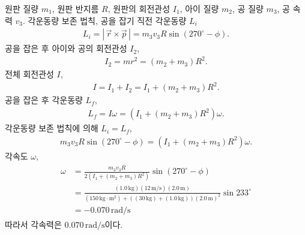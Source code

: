 \documentclass[floatfix,nofootinbib,superscriptaddress,fleqn]{revtex4-2}
\begin{document}
원판 질량 $m_1$, 원판 반지름 $R$, 원판의 회전관성 $I_1$, 
아이 질량 $m_2$, 공 질량 $m_3$, 공 속력 $v_3$.
각운동량 보존 법칙, 공을 잡기 직전 각운동량 $L_i$
\begin{align}
  L_i =|\,\vec{r}\times\vec{p}\,|
  = m_3v_3R\sin\left(270^\circ-\phi\right).
\end{align}
공을 잡은 후 아이와 공의 회전관성 $I_2$,
\begin{align}
  I_2 = mr^2 = (m_2+m_3)R^2.
\end{align} 
전체 회전관성 $I$,
\begin{align}
  I = I_1 + I_2 = I_1+(m_2+m_3)R^2.
\end{align}
공을 잡은 후 각운동량 $L_f$,
\begin{align}
  L_f = I\omega = (I_1+(m_2+m_3)R^2)\omega.
\end{align}
각운동량 보존 법칙에 의해 $L_i = L_f$,
\begin{align}
  m_3v_3R\sin\left(270^\circ-\phi\right)
  =(I_1+(m_2+m_3)R^2)\omega.
\end{align}
각속도 $\omega$,
\begin{align}
  \begin{split}
    \omega &= \frac{m_3v_3R}{2(I_1+(m_2+m_3)R^2)}\sin\left(270^\circ-\phi\right)  \\
    &= \frac{(1.0\,\mathrm{kg})(12\,\mathrm{m/s})(2.0\,\mathrm{m})}{(150\,\mathrm{kg\cdot m^2})
    +((30\,\mathrm{kg})+(1.0\,\mathrm{kg}))(2.0\,\mathrm{m})^2}\sin 233^\circ \\
   &=-0.070\,\mathrm{rad/s}
  \end{split}
\end{align}
따라서 각속력은 $0.070\,\mathrm{rad/s}$이다.
\vspace{1.cm}
\end{document}
